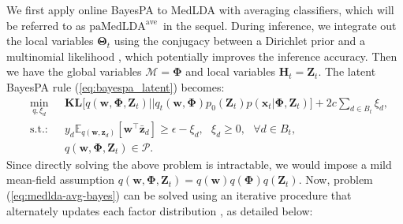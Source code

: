 \documentclass[twoside,11pt]{article}
\newcommand{\xv}{\bm{x}}
\newcommand{\zv}{\bm{z}}
\newcommand{\Zv}{\bm{Z}}
\newcommand{\Hv}{\bm{H}}
\newcommand{\wv}{\bm{w}}
\newcommand{\Thetav}{\bm{\Theta}}
\newcommand{\Phiv}{\bm{\Phi}}
\newcommand{\Mv}{\bm{\mathcal{M}}}
\newcommand{\ep}{\mathbb{E}}
\newcommand{\KL}{\textbf{KL}}
\newcommand{\barzv}{\bm{\bar{z}}}
\newcommand{\subto}{\text{s.t.:}}
\newcommand\paMedLDAave{$\text{paMedLDA}^{\text{ave}}$~}
\begin{document}
We first apply online BayesPA to MedLDA with averaging classifiers, which will be referred to as \paMedLDAave in the sequel. During inference, we integrate out the local variables $\Thetav_t$ using the conjugacy between a Dirichlet prior and a multinomial likelihood \citep{griffiths2004finding,teh2006collapsed}, which potentially improves the inference accuracy. Then we have the global variables $\Mv = \Phiv$ and local variables $\Hv_t = \Zv_t$. The latent BayesPA rule (\ref{eq:bayespa_latent}) becomes:
\begin{eqnarray}\label{eq:medlda-avg-bayes}
 &  \underset{q, \xi_d}{\operatorname{min}}~~~ & \KL\Big[q(\wv, \Phiv, \Zv_t) || q_t(\wv, \Phiv) p_0(\Zv_t) p(\xv_t | \Phiv, \Zv_t) \Big] + 2c \sum\limits_{d \in B_t}{\xi_d}, \\
 & \subto &  y_d \ep_{q(\wv, \zv_d)}[\wv^\top \barzv_d] \geq \epsilon-\xi_d, ~~~ \xi_d \geq 0, ~~~  \forall d \in B_t,  \nonumber \\
 &            & q(\wv, \Phiv, \Zv_t) \in \mathcal{P}. \nonumber
\end{eqnarray}
%
Since directly solving the above problem is intractable, we would impose a mild mean-field assumption $q(\wv, \Phiv, \Zv_t) = q(\wv) q(\Phiv) q(\Zv_t)$. Now, problem (\ref{eq:medlda-avg-bayes}) can be solved using an iterative procedure that alternately updates each factor distribution \citep{jordan1998introduction}, as detailed below:
%
\end{document}
